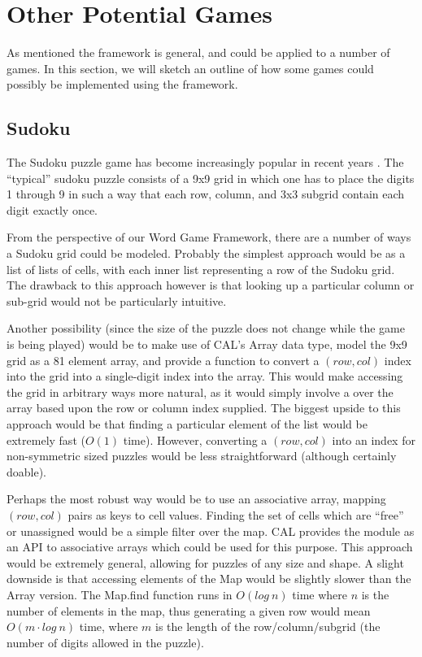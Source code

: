 \section{Other Potential Games}
\label{potentialGames}

As mentioned the framework is general, and could be applied to a number of games.  In this section, we will sketch an outline of how some games could possibly be implemented using the framework.

\subsection{Sudoku}

The Sudoku puzzle game has become increasingly popular in recent years \cite{sudoku08}.  The ``typical'' sudoku puzzle consists of a 9x9 grid in which one has to place the digits 1 through 9 in such a way that each row, column, and 3x3 subgrid contain each digit exactly once.

From the perspective of our Word Game Framework, there are a number of ways a Sudoku grid could be modeled.  Probably the simplest approach would be as a list of lists of cells, with each inner list representing a row of the Sudoku grid.  The drawback to this approach however is that looking up a particular column or sub-grid would not be particularly intuitive.

Another possibility (since the size of the puzzle does not change while the game is being played) would be to make use of CAL's Array data type, model the 9x9 grid as a 81 element array, and provide a function to convert a $(row, col)$ index into the grid into a single-digit index into the array.  This would make accessing the grid in arbitrary ways more natural, as it would simply involve a  over the array based upon the row or column index supplied.  The biggest upside to this approach would be that finding a particular element of the list would be extremely fast ($O(1)$ time).  However, converting a $(row, col)$ into an index for non-symmetric sized puzzles would be less straightforward (although certainly doable).

Perhaps the most robust way would be to use an associative array, mapping $(row, col)$ pairs as keys to cell values.  Finding the set of cells which are ``free'' or unassigned would be a simple filter over the map.  CAL provides the  module as an API to associative arrays which could be used for this purpose.  This approach would be extremely general, allowing for puzzles of any size and shape.  A slight downside is that accessing elements of the Map would be slightly slower than the Array version.  The Map.find function runs in $O(log\:n)$ time where $n$ is the number of elements in the map, thus generating a given row would mean $O(m \cdot log\:n)$ time, where $m$ is the length of the row/column/subgrid (\ie the number of digits allowed in the puzzle).

